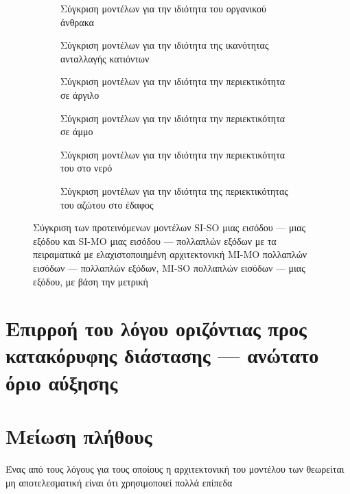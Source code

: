 \begin{figure}[htbp]
    \begin{subfigure}{0.5\textwidth}
        
        \caption{Σύγκριση μοντέλων για την ιδιότητα του οργανικού άνθρακα}
        \label{fig:subim1}
    \end{subfigure}
    \begin{subfigure}{0.5\textwidth}
        
        \caption{Σύγκριση μοντέλων για την ιδιότητα της ικανότητας ανταλλαγής κατιόντων}
        \label{fig:subim2}
    \end{subfigure}
    \begin{subfigure}{0.5\textwidth}
        
        \caption{Σύγκριση μοντέλων για την ιδιότητα την περιεκτικότητα σε άργιλο}
        \label{fig:subim3}
    \end{subfigure}
    \begin{subfigure}{0.5\textwidth}
        
        \caption{Σύγκριση μοντέλων για την ιδιότητα την περιεκτικότητα σε άμμο}
        \label{fig:subim4}
    \end{subfigure}
    \begin{subfigure}{0.5\textwidth}
        
        \caption{Σύγκριση μοντέλων για την ιδιότητα την περιεκτικότητα του  στο νερό}
        \label{fig:subim5}
    \end{subfigure}
    \begin{subfigure}{0.5\textwidth}
        
        \caption{Σύγκριση μοντέλων για την ιδιότητα της περιεκτικότητας του αζώτου στο έδαφος}
        \label{fig:subim6}
    \end{subfigure}
    \caption{Σύγκριση των προτεινόμενων μοντέλων SI-SO μιας εισόδου --- μιας εξόδου και SI-MO μιας εισόδου --- πολλαπλών εξόδων με τα πειραματικά με ελαχιστοποιημένη αρχιτεκτονική MI-MO πολλαπλών εισόδων --- πολλαπλών εξόδων, MI-SO πολλαπλών εισόδων --- μιας εξόδου, με βάση την μετρική }
\end{figure}

\section{Επιρροή του λόγου οριζόντιας προς κατακόρυφης διάστασης --- ανώτατο όριο αύξησης}


\section{Μείωση πλήθους }
Ένας από τους λόγους για τους οποίους η αρχιτεκτονική του μοντέλου των  θεωρείται μη αποτελεσματική είναι ότι χρησιμοποιεί πολλά επίπεδα 

